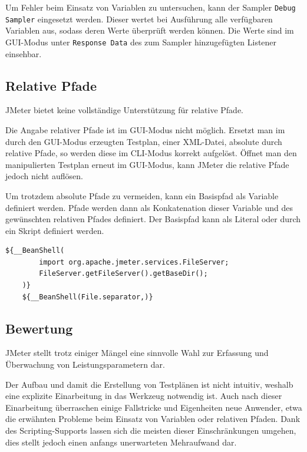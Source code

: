 Um Fehler beim Einsatz von Variablen zu untersuchen,
kann der Sampler \texttt{Debug Sampler} eingesetzt werden.
Dieser wertet bei Ausführung alle verfügbaren Variablen aus, sodass deren Werte überprüft werden können.
Die Werte sind im GUI-Modus unter \texttt{Response Data} des zum Sampler hinzugefügten Listener einsehbar.

\subsection{Relative Pfade}

JMeter bietet keine vollständige Unterstützung für relative Pfade.

Die Angabe relativer Pfade ist im GUI-Modus nicht möglich.
Ersetzt man im durch den GUI-Modus erzeugten Testplan, einer XML-Datei, absolute durch relative Pfade,
so werden diese im CLI-Modus korrekt aufgelöst.
Öffnet man den manipulierten Testplan erneut im GUI-Modus,
kann JMeter die relative Pfade jedoch nicht auflösen.

Um trotzdem absolute Pfade zu vermeiden, 
kann ein Basispfad als Variable definiert werden.
Pfade werden dann als Konkatenation dieser Variable und des gewünschten relativen Pfades definiert.
Der Basispfad kann als Literal oder durch ein Skript definiert werden.

\begin{lstlisting}[caption=Ermitteln des Working Directory\protect\footnotemark]
    ${__BeanShell(
        import org.apache.jmeter.services.FileServer; 
        FileServer.getFileServer().getBaseDir();
    )}
    ${__BeanShell(File.separator,)}
\end{lstlisting}

\subsection{Bewertung}

JMeter stellt trotz einiger Mängel eine sinnvolle Wahl zur Erfassung und Überwachung von Leistungsparametern dar.

Der Aufbau und damit die Erstellung von Testplänen ist nicht intuitiv, 
weshalb eine explizite Einarbeitung in das Werkzeug notwendig ist.
Auch nach dieser Einarbeitung überraschen einige Fallstricke und Eigenheiten neue Anwender,
etwa die erwähnten Probleme beim Einsatz von Variablen oder relativen Pfaden.
Dank des Scripting-Supports lassen sich die meisten dieser Einschränkungen umgehen,
dies stellt jedoch einen anfangs unerwarteten Mehraufwand dar.

